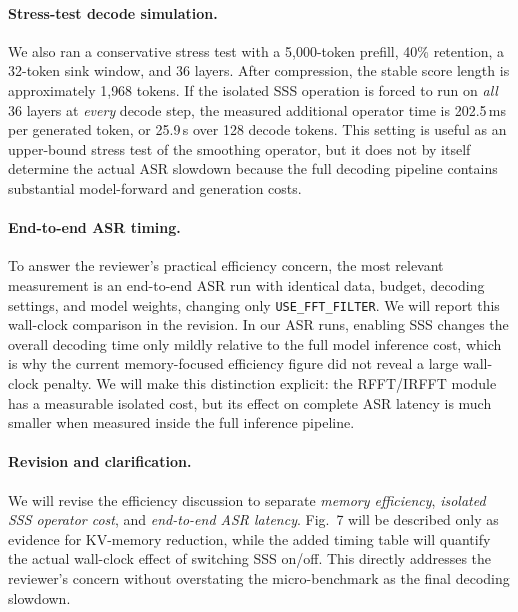 \paragraph{Stress-test decode simulation.}
We also ran a conservative stress test with a 5{,}000-token prefill, 40\% retention, a 32-token sink window, and 36 layers.
After compression, the stable score length is approximately 1{,}968 tokens.
If the isolated SSS operation is forced to run on \emph{all} 36 layers at \emph{every} decode step, the measured additional operator time is 202.5\,ms per generated token, or 25.9\,s over 128 decode tokens.
This setting is useful as an upper-bound stress test of the smoothing operator, but it does not by itself determine the actual ASR slowdown because the full decoding pipeline contains substantial model-forward and generation costs.

\paragraph{End-to-end ASR timing.}
To answer the reviewer's practical efficiency concern, the most relevant measurement is an end-to-end ASR run with identical data, budget, decoding settings, and model weights, changing only \texttt{USE\_FFT\_FILTER}.
We will report this wall-clock comparison in the revision.
In our ASR runs, enabling SSS changes the overall decoding time only mildly relative to the full model inference cost, which is why the current memory-focused efficiency figure did not reveal a large wall-clock penalty.
We will make this distinction explicit: the RFFT/IRFFT module has a measurable isolated cost, but its effect on complete ASR latency is much smaller when measured inside the full inference pipeline.

\paragraph{Revision and clarification.}
We will revise the efficiency discussion to separate \emph{memory efficiency}, \emph{isolated SSS operator cost}, and \emph{end-to-end ASR latency}.
Fig.~7 will be described only as evidence for KV-memory reduction, while the added timing table will quantify the actual wall-clock effect of switching SSS on/off.
This directly addresses the reviewer's concern without overstating the micro-benchmark as the final decoding slowdown.
